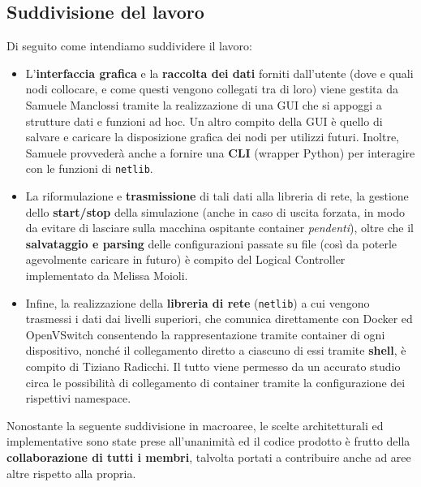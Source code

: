 \subsection{Suddivisione del lavoro}
Di seguito come intendiamo suddividere il lavoro:
\begin{itemize}
    \item L'\textbf{interfaccia grafica} e la \textbf{raccolta dei dati} forniti dall'utente (dove e quali nodi collocare, e come questi vengono collegati tra di loro) viene gestita da Samuele Manclossi tramite la realizzazione di una GUI che si appoggi a strutture dati e funzioni ad hoc. Un altro compito della GUI è quello di salvare e caricare la disposizione grafica dei nodi per utilizzi futuri. Inoltre, Samuele provvederà anche a fornire una \textbf{CLI} (wrapper Python) per interagire con le funzioni di \texttt{netlib}.
    \item La riformulazione e \textbf{trasmissione} di tali dati alla libreria di rete, la gestione dello \textbf{start/stop} della simulazione (anche in caso di uscita forzata, in modo da evitare di lasciare sulla macchina ospitante container \textsl{pendenti}), oltre che il \textbf{salvataggio e parsing} delle configurazioni passate su file (così da poterle agevolmente caricare in futuro) è compito del Logical Controller implementato da Melissa Moioli.
    \item Infine, la realizzazione della \textbf{libreria di rete} (\texttt{netlib}) a cui vengono trasmessi i dati dai livelli superiori, che comunica direttamente con Docker ed OpenVSwitch consentendo la rappresentazione tramite container di ogni dispositivo, nonché il collegamento diretto a ciascuno di essi tramite \textbf{shell}, è compito di Tiziano Radicchi. Il tutto viene permesso da un accurato studio circa le possibilità di collegamento di container tramite la configurazione dei rispettivi namespace.
\end{itemize}
Nonostante la seguente suddivisione in macroaree, le scelte architetturali ed implementative sono state prese all'unanimità ed il codice prodotto è frutto della \textbf{collaborazione di tutti i membri}, talvolta portati a contribuire anche ad aree altre rispetto alla propria.

\newpage
